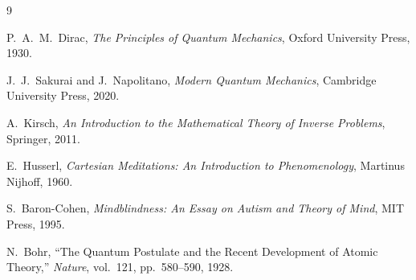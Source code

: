 ﻿\documentclass[11pt,a4paper]{article}
\begin{document}

\begin{thebibliography}{9}

P.~A.~M.~Dirac, \emph{The Principles of Quantum Mechanics}, Oxford University Press, 1930.

J.~J.~Sakurai and J.~Napolitano, \emph{Modern Quantum Mechanics}, Cambridge University Press, 2020.

A.~Kirsch, \emph{An Introduction to the Mathematical Theory of Inverse Problems}, Springer, 2011.

E.~Husserl, \emph{Cartesian Meditations: An Introduction to Phenomenology}, Martinus Nijhoff, 1960.

S.~Baron-Cohen, \emph{Mindblindness: An Essay on Autism and Theory of Mind}, MIT Press, 1995.

N.~Bohr, ``The Quantum Postulate and the Recent Development of Atomic Theory,'' \emph{Nature}, vol.~121, pp.~580--590, 1928.

\end{thebibliography}
\end{document}
